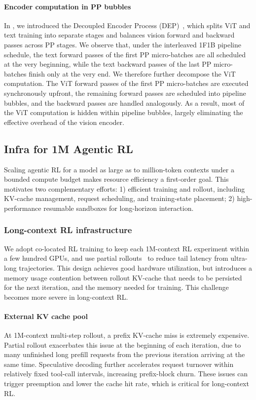 \paragraph{Encoder computation in PP bubbles}
In , we introduced the Decoupled Encoder Process (DEP)~\citep{kimik25}, which splits ViT and text training into separate stages and balances vision forward and backward passes across PP stages.
We observe that, under the interleaved 1F1B pipeline schedule, the text forward passes of the first PP micro-batches are all scheduled at the very beginning, while the text backward passes of the last PP micro-batches finish only at the very end.
We therefore further decompose the ViT computation.
The ViT forward passes of the first PP micro-batches are executed synchronously upfront, the remaining forward passes are scheduled into pipeline bubbles, and the backward passes are handled analogously.
As a result, most of the ViT computation is hidden within pipeline bubbles, largely eliminating the effective overhead of the vision encoder.






\subsection{Infra for 1M Agentic RL}

Scaling agentic RL for a model as large as  to million-token contexts under a bounded compute budget makes resource efficiency a first-order goal. This motivates two complementary efforts: 1) efficient training and rollout, including KV-cache management, request scheduling, and training-state placement; 2) high-performance resumable sandboxes for long-horizon interaction.

\subsubsection{Long-context RL infrastructure}
We adopt co-located RL training \cite{kimiteam2025kimik2openagentic} to keep each 1M-context  RL experiment within a few hundred GPUs, and use partial rollouts~\cite{kimik15} to reduce tail latency from ultra-long trajectories. This design achieves good hardware utilization, but introduces a memory usage contention between rollout KV-cache that needs to be persisted for the next iteration, and the memory needed for training. This challenge becomes more severe in long-context RL.

\paragraph{External KV cache pool}
At 1M-context multi-step rollout, a prefix KV-cache miss is extremely expensive. Partial rollout exacerbates this issue at the beginning of each iteration, due to many unfinished long prefill requests from the previous iteration arriving at the same time. Speculative decoding further accelerates request turnover within relatively fixed tool-call intervals, increasing prefix-block churn. These issues can trigger preemption and lower the cache hit rate, which is critical for long-context RL.

